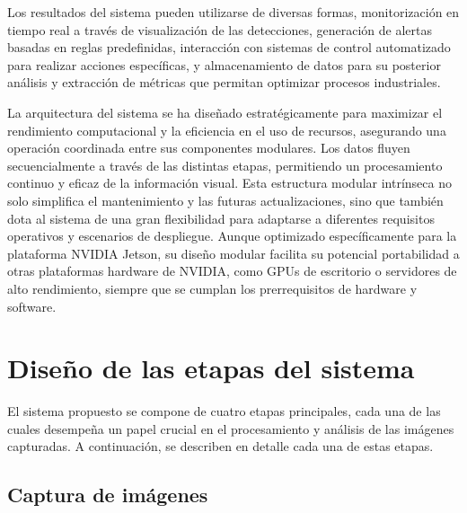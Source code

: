\documentclass[11pt,spanish,listoffigures,listoftables]{tfgetsinf}
\begin{document}
Los resultados del sistema pueden utilizarse de diversas formas, monitorización en tiempo real a través de visualización de las detecciones, generación de alertas basadas en reglas predefinidas, interacción con sistemas de control automatizado para realizar acciones específicas, y almacenamiento de datos para su posterior análisis y extracción de métricas que permitan optimizar procesos industriales.

La arquitectura del sistema se ha diseñado estratégicamente para maximizar el rendimiento computacional y la eficiencia en el uso de recursos, asegurando una operación coordinada entre sus componentes modulares. Los datos fluyen secuencialmente a través de las distintas etapas, permitiendo un procesamiento continuo y eficaz de la información visual. Esta estructura modular intrínseca no solo simplifica el mantenimiento y las futuras actualizaciones, sino que también dota al sistema de una gran flexibilidad para adaptarse a diferentes requisitos operativos y escenarios de despliegue. Aunque optimizado específicamente para la plataforma NVIDIA Jetson, su diseño modular facilita su potencial portabilidad a otras plataformas hardware de NVIDIA, como GPUs de escritorio o servidores de alto rendimiento, siempre que se cumplan los prerrequisitos de hardware y software.


\section{Diseño de las etapas del sistema} \label{sec:diseno_etapas}
 
El sistema propuesto se compone de cuatro etapas principales, cada una de las cuales desempeña un papel crucial en el procesamiento y análisis de las imágenes capturadas. A continuación, se describen en detalle cada una de estas etapas.

\subsection{Captura de imágenes} \label{sec:captura_imagenes}
\end{document}
